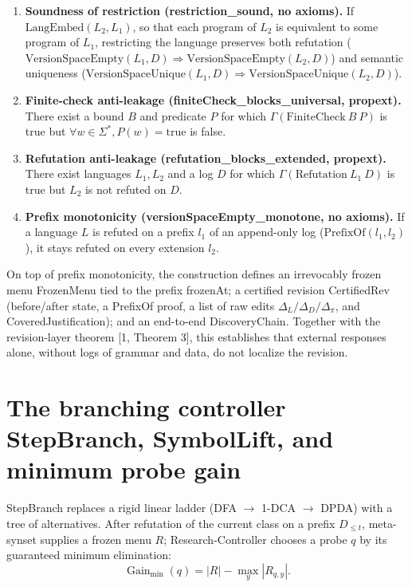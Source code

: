 \documentclass[11pt,a4paper]{article}
\begin{document}
\begin{enumerate}
\item \textbf{Soundness of restriction (restriction\_\allowbreak sound, no axioms).} If \(\mathrm{LangEmbed}(L_2,L_1)\), so that each program of \(L_2\) is equivalent to some program of \(L_1\), restricting the language preserves both refutation (\(\mathrm{VersionSpaceEmpty}(L_1,D)\Rightarrow\mathrm{VersionSpaceEmpty}(L_2,D)\)) and semantic uniqueness (\(\mathrm{VersionSpaceUnique}(L_1,D)\Rightarrow\mathrm{VersionSpaceUnique}(L_2,D)\)).
\item \textbf{Finite-check anti-leakage (finiteCheck\_\allowbreak blocks\_\allowbreak universal, propext).} There exist a bound \(B\) and predicate \(P\) for which \(\Gamma(\mathrm{FiniteCheck}\ B\ P)\) is true but \(\forall w\in\Sigma^*, P(w)=\mathrm{true}\) is false.
\item \textbf{Refutation anti-leakage (refutation\_\allowbreak blocks\_\allowbreak extended, propext).} There exist languages \(L_1,L_2\) and a log \(D\) for which \(\Gamma(\mathrm{Refutation}\ L_1\ D)\) is true but \(L_2\) is not refuted on \(D\).
\item \textbf{Prefix monotonicity (versionSpaceEmpty\_\allowbreak monotone, no axioms).} If a language \(L\) is refuted on a prefix \(l_1\) of an append-only log (\(\mathrm{PrefixOf}(l_1,l_2)\)), it stays refuted on every extension \(l_2\).

\end{enumerate}
On top of prefix monotonicity, the construction defines an irrevocably frozen menu FrozenMenu tied to the prefix frozenAt; a certified revision CertifiedRev (before/after state, a PrefixOf proof, a list of raw edits \(\Delta_L/\Delta_D/\Delta_\pi\), and CoveredJustification); and an end-to-end DiscoveryChain. Together with the revision-layer theorem [1, Theorem 3], this establishes that external responses alone, without logs of grammar and data, do not localize the revision.

\section{The branching controller StepBranch, SymbolLift, and minimum probe gain}

StepBranch replaces a rigid linear ladder (DFA \(\to\) 1-DCA \(\to\) DPDA) with a tree of alternatives. After refutation of the current class on a prefix \(D_{\le t}\), meta-synset supplies a frozen menu \(R\); Research-Controller chooses a probe \(q\) by its guaranteed minimum elimination:
\[
\operatorname{Gain}_{\min}(q)=|R|-\max_y|R_{q,y}|.\tag{3}
\]
\end{document}
